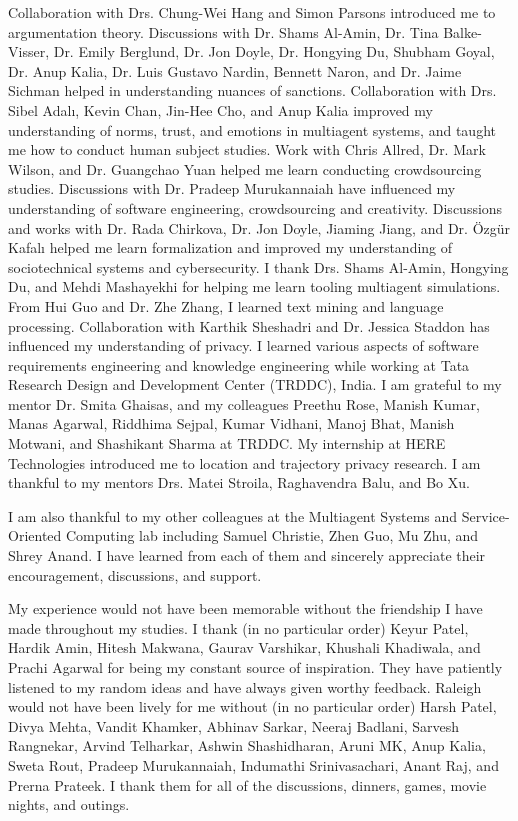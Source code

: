 \begin{acknowledgements}
%
Collaboration with Drs. Chung-Wei Hang and Simon Parsons introduced me to argumentation theory. 
Discussions with Dr. Shams Al-Amin, Dr. Tina Balke-Visser, Dr. Emily Berglund, Dr. Jon Doyle, Dr. Hongying Du, Shubham Goyal, Dr. Anup Kalia, Dr. Luis Gustavo Nardin, Bennett Naron, and Dr. Jaime Sichman helped in understanding nuances of sanctions. 
Collaboration with Drs. Sibel Adal{\i}, Kevin Chan, Jin-Hee Cho, and Anup Kalia improved my understanding of norms, trust, and emotions in multiagent systems, and taught me how to conduct human subject studies. Work with Chris Allred, Dr. Mark Wilson, and Dr. Guangchao Yuan helped me learn conducting crowdsourcing studies. 
Discussions with Dr. Pradeep Murukannaiah have influenced my understanding of software engineering, crowdsourcing and creativity.
Discussions and works with Dr. Rada Chirkova, Dr. Jon Doyle, Jiaming Jiang, and Dr. {\"O}zg{\"u}r Kafal{\i} helped me learn formalization and improved my understanding of sociotechnical systems and cybersecurity. I thank Drs. Shams Al-Amin, Hongying Du, and Mehdi Mashayekhi for helping me learn tooling multiagent simulations. 
From Hui Guo and Dr. Zhe Zhang, I learned text mining and language processing. 
Collaboration with Karthik Sheshadri and Dr. Jessica Staddon has influenced my understanding of privacy. 
I learned various aspects of software requirements engineering and knowledge engineering while working at Tata Research Design and Development Center (TRDDC), India. I am grateful to my mentor Dr. Smita Ghaisas, and my colleagues Preethu Rose, Manish Kumar, Manas Agarwal, Riddhima Sejpal, Kumar Vidhani, Manoj Bhat, Manish Motwani, and Shashikant Sharma at TRDDC.
My internship at HERE Technologies introduced me to location and trajectory privacy research. I am thankful to my mentors Drs. Matei Stroila, Raghavendra Balu, and Bo Xu. 

I am also thankful to my other colleagues at the Multiagent Systems and Service-Oriented Computing lab including Samuel Christie, Zhen Guo, Mu Zhu, and Shrey Anand. I have learned from each of them and sincerely appreciate their encouragement, discussions, and support. 

My experience would not have been memorable without the friendship I have made throughout my studies. 
I thank (in no particular order) Keyur Patel, Hardik Amin, Hitesh Makwana, Gaurav Varshikar, Khushali Khadiwala, and Prachi Agarwal for being my constant source of inspiration. 
They have patiently listened to my random ideas and have always given worthy feedback. 
Raleigh would not have been lively for me without (in no particular order) Harsh Patel, Divya Mehta, Vandit Khamker, Abhinav Sarkar, Neeraj Badlani, Sarvesh Rangnekar, Arvind Telharkar, Ashwin Shashidharan, Aruni MK, Anup Kalia, Sweta Rout, Pradeep Murukannaiah, Indumathi Srinivasachari, Anant Raj, and Prerna Prateek.
I thank them for all of the discussions, dinners, games, movie nights, and outings. 


\end{acknowledgements}
